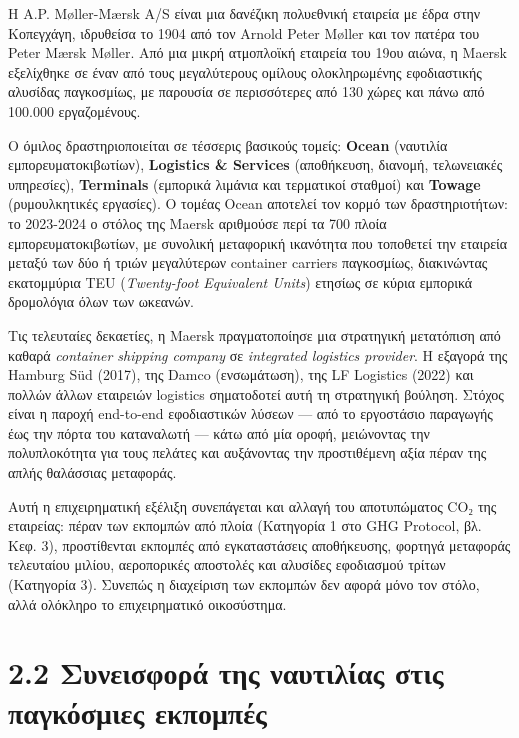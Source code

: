 \documentclass[11pt,a4paper,greek,twoside]{template-xe}
\begin{document}
Η A.P. Møller-Mærsk A/S είναι μια δανέζικη πολυεθνική εταιρεία με έδρα
στην Κοπεγχάγη, ιδρυθείσα το 1904 από τον Arnold Peter Møller και τον
πατέρα του Peter Mærsk Møller. Από μια μικρή ατμοπλοϊκή εταιρεία του
19ου αιώνα, η Maersk εξελίχθηκε σε έναν από τους μεγαλύτερους ομίλους
ολοκληρωμένης εφοδιαστικής αλυσίδας παγκοσμίως, με παρουσία σε
περισσότερες από 130 χώρες και πάνω από 100.000 εργαζομένους.

Ο όμιλος δραστηριοποιείται σε τέσσερις βασικούς τομείς: \textbf{Ocean}
(ναυτιλία εμπορευματοκιβωτίων), \textbf{Logistics \& Services}
(αποθήκευση, διανομή, τελωνειακές υπηρεσίες), \textbf{Terminals}
(εμπορικά λιμάνια και τερματικοί σταθμοί) και \textbf{Towage}
(ρυμουλκητικές εργασίες). Ο τομέας Ocean αποτελεί τον κορμό των
δραστηριοτήτων: το 2023-2024 ο στόλος της Maersk αριθμούσε περί τα 700
πλοία εμπορευματοκιβωτίων, με συνολική μεταφορική ικανότητα που
τοποθετεί την εταιρεία μεταξύ των δύο ή τριών μεγαλύτερων container
carriers παγκοσμίως, διακινώντας εκατομμύρια TEU (\emph{Twenty-foot
Equivalent Units}) ετησίως σε κύρια εμπορικά δρομολόγια όλων των
ωκεανών.

Τις τελευταίες δεκαετίες, η Maersk πραγματοποίησε μια στρατηγική
μετατόπιση από καθαρά \emph{container shipping company} σε
\emph{integrated logistics provider}. Η εξαγορά της Hamburg Süd (2017),
της Damco (ενσωμάτωση), της LF Logistics (2022) και πολλών άλλων
εταιρειών logistics σηματοδοτεί αυτή τη στρατηγική βούληση. Στόχος είναι
η παροχή end-to-end εφοδιαστικών λύσεων --- από το εργοστάσιο παραγωγής
έως την πόρτα του καταναλωτή --- κάτω από μία οροφή, μειώνοντας την
πολυπλοκότητα για τους πελάτες και αυξάνοντας την προστιθέμενη αξία
πέραν της απλής θαλάσσιας μεταφοράς.

Αυτή η επιχειρηματική εξέλιξη συνεπάγεται και αλλαγή του αποτυπώματος
CO₂ της εταιρείας: πέραν των εκπομπών από πλοία (Κατηγορία 1 στο GHG
Protocol, βλ. Κεφ. 3), προστίθενται εκπομπές από εγκαταστάσεις
αποθήκευσης, φορτηγά μεταφοράς τελευταίου μιλίου, αεροπορικές αποστολές
και αλυσίδες εφοδιασμού τρίτων (Κατηγορία 3). Συνεπώς η διαχείριση των
εκπομπών δεν αφορά μόνο τον στόλο, αλλά ολόκληρο το επιχειρηματικό
οικοσύστημα.

\section{2.2 Συνεισφορά της ναυτιλίας στις παγκόσμιες
εκπομπές}\label{ux3c3ux3c5ux3bdux3b5ux3b9ux3c3ux3c6ux3bfux3c1ux3ac-ux3c4ux3b7ux3c2-ux3bdux3b1ux3c5ux3c4ux3b9ux3bbux3afux3b1ux3c2-ux3c3ux3c4ux3b9ux3c2-ux3c0ux3b1ux3b3ux3baux3ccux3c3ux3bcux3b9ux3b5ux3c2-ux3b5ux3baux3c0ux3bfux3bcux3c0ux3adux3c2}
\end{document}
